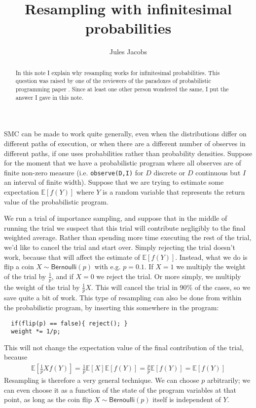 \documentclass[a4paper, 11pt]{article}
\title{Resampling with infinitesimal probabilities}
\author{Jules Jacobs}
\theoremstyle{definition}
\begin{document}
\maketitle

\begin{abstract}
  In this note I explain why resampling works for infinitesimal probabilities. This question was raised by one of the reviewers of the paradoxes of probabilistic programming paper \cite{jacobs_paradoxes_2021}. Since at least one other person wondered the same, I put the answer I gave in this note.
\end{abstract}

\newcommand{\Bernoulli}{\mathsf{Bernoulli}}
\newcommand{\E}{\mathbb{E}}

SMC can be made to work quite generally, even when the distributions differ on different paths of execution, or when there are a different number of observes in different paths, if one uses probabilities rather than probability densities. Suppose for the moment that we have a probabilistic program where all observes are of finite non-zero measure (i.e. \lstinline|observe(D,I)| for $D$ discrete or $D$ continuous but $I$ an interval of finite width). Suppose that we are trying to estimate some expectation $\E[f(Y)]$ where $Y$ is a random variable that represents the return value of the probabilistic program.

We run a trial of importance sampling, and suppose that in the middle of running the trial we suspect that this trial will contribute negligibly to the final weighted average. Rather than spending more time executing the rest of the trial, we'd like to cancel the trial and start over. Simply rejecting the trial doesn't work, because that will affect the estimate of $\E[f(Y)]$. Instead, what we do is flip a coin $X \sim \Bernoulli(p)$ with e.g. $p = 0.1$. If $X = 1$ we multiply the weight of the trial by $\frac{1}{p}$, and if $X = 0$ we reject the trial. Or more simply, we multiply the weight of the trial by $\frac{1}{p}X$. This will cancel the trial in 90\% of the cases, so we save quite a bit of work. This type of resampling can also be done from within the probabilistic program, by inserting this somewhere in the program:

\begin{lstlisting}
  if(flip(p) == false){ reject(); }
  weight *= 1/p;
\end{lstlisting}

This will not change the expectation value of the final contribution of the trial, because
\begin{align*}
  \E[\frac{1}{p} X f(Y)] = \frac{1}{p} \E[X] \E[f(Y)] = \frac{p}{p} \E[f(Y)] = \E[f(Y)]
\end{align*}
Resampling is therefore a very general technique. We can choose $p$ arbitrarily; we can even choose it as a function of the state of the program variables at that point, as long as the coin flip $X \sim \Bernoulli(p)$ itself is independent of $Y$.
\end{document}
